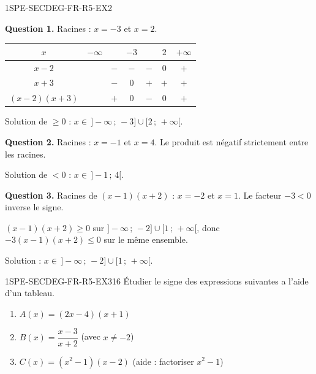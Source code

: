 \begin{corrige}{1SPE-SECDEG-FR-R5-EX2}


\textbf{Question 1.} Racines : $x = -3$ et $x = 2$.

\begin{center}
\begin{tabular}{|c|cccccc|}
\hline
$x$ & $-\infty$ & & $-3$ & & $2$ & $+\infty$ \\
\hline
$x - 2$ & & $-$ & $-$ & $-$ & $0$ & $+$ \\
$x + 3$ & & $-$ & $0$ & $+$ & $+$ & $+$ \\
\hline
$(x-2)(x+3)$ & & $+$ & $0$ & $-$ & $0$ & $+$ \\
\hline
\end{tabular}
\end{center}

Solution de $\geq 0$ : $x \in \,]-\infty\,;\,-3] \cup [2\,;\,+\infty[$.

\textbf{Question 2.} Racines : $x = -1$ et $x = 4$. Le produit est négatif strictement entre les racines.

Solution de $< 0$ : $x \in \,]-1\,;\,4[$.

\textbf{Question 3.} Racines de $(x-1)(x+2)$ : $x = -2$ et $x = 1$. Le facteur $-3 < 0$ inverse le signe.

$(x-1)(x+2) \geq 0$ sur $]-\infty\,;\,-2] \cup [1\,;\,+\infty[$, donc $-3(x-1)(x+2) \leq 0$ sur le même ensemble.

Solution : $x \in \,]-\infty\,;\,-2] \cup [1\,;\,+\infty[$.

\end{corrige}


\begin{exercice}{1SPE-SECDEG-FR-R5-EX3}{1}{6}
Étudier le signe des expressions suivantes a l'aide d'un tableau.
\begin{enumerate}
  \item $A(x) = (2x - 4)(x + 1)$
  \item $B(x) = \dfrac{x - 3}{x + 2}$ (avec $x
\neq -2$)
  \item $C(x) = (x^2 - 1)(x - 2)$ (aide : factoriser $x^2 - 1$)
\end{enumerate}
\end{exercice}



